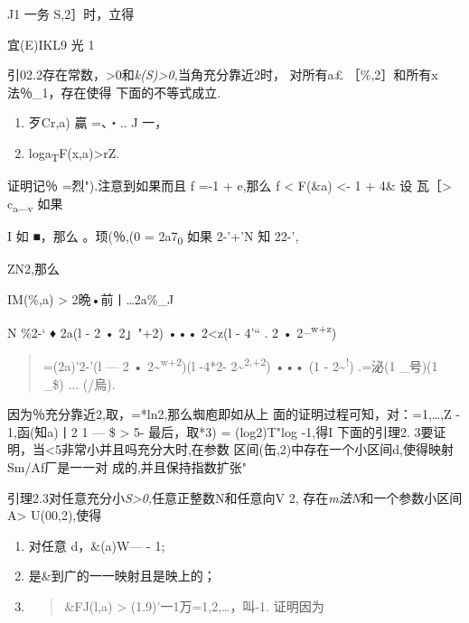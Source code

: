 J1 一务 S,2］时，立得

宜(E)IKL9 光 1

引02.2存在常数，\textgreater{}0和\emph{k(S)\textgreater{}0,}当角充分靠近2时，
对所有a£ ［\%,2］和所有\textbar{}x\textbar{}法％\_1，存在使得
下面的不等式成立.

\begin{enumerate}
\def\labelenumi{(\arabic{enumi})}
\item
  \textbar{}歹Cr,a) \textbar{} 贏 =、・.. J 一，
\item
  log\textbar{}a\textsubscript{T}F(x,a)\textbar{}\textgreater{}rZ.
\end{enumerate}

证明记％ =烈").注意到如果而且 f =-1 + e,那么 f \textless{} F(\&a)
\textless{}- 1 + 4\& 设 瓦［\textgreater{}
c\textsubscript{a}\_\textsubscript{v} 如果

I 如 ■，那么 \textbar{}。顼(％,(0\textbar{} =
\textbar{}2a7\textsubscript{0}\textbar{} 如果 2-'+'N 知 22-',

ZN2,那么

IM(\%,a)\textbar{} \textgreater{}
\textbar{}2晩•前丨\ldots{}\textbar{}2a\%\_J

N \%2-` ♦ 2a(l - 2 • 2」"+2) ••• 2\textless{}z(l - 4'`` . 2 •
2\textsuperscript{\_w+z})

\begin{quote}
=(2a)'2-'(l --- 2 • 2\textasciitilde{}\textsuperscript{w+2})(l -4*2-
2\textasciitilde{}\textsuperscript{2,+2}) ••• (1 -
2\textasciitilde{}\textsuperscript{!}) .=泌(1 \_号)(1 \_\$) ... (/烏).
\end{quote}

因为％充分靠近2,取，=*ln2,那么蜘庖即如从上
面的证明过程可知，对：=1,\ldots{},Z - 1,函(知a)丨2 1 --- \$
\textgreater{} 5- 最后，取*3) = (log2)T"log -1,得I 下面的引理2.
3要证明，当\textless{}5非常小并且吗充分大时,在参数
区间(缶,2)中存在一个小区间d,使得映射Sm/Af厂是一一对
成的,并且保持指数扩张"

引理2.3对任意充分小\emph{S\textgreater{}0,}任意正整数N和任意向V 2,
存在\emph{m法N}和一个参数小区间A\textgreater{} U(00,2),使得

\begin{enumerate}
\def\labelenumi{(\arabic{enumi})}
\item
  对任意 d，\&(a)W--- - 1;
\item
  是\&到广的一一映射且是映上的；
\item
  \begin{quote}
  \textbar{}\&FJ(l,a)\textbar{} \textgreater{}
  (1.9)'一1万=1,2,\ldots{}，叫-1. 证明因为
  \end{quote}
\end{enumerate}

